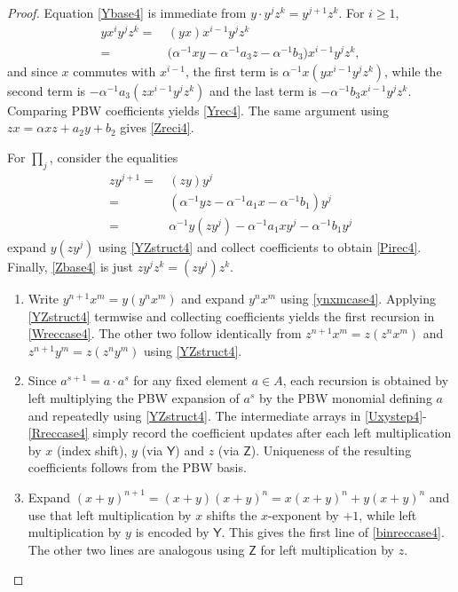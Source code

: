 \documentclass{amsart}
\theoremstyle{definition}
\theoremstyle{remark}
\numberwithin{equation}{section}
\begin{document}
\begin{proof}
Equation \eqref{Ybase4} is immediate from $y\cdot y^j z^k=y^{j+1}z^k$. For $i\ge 1$,
\begin{align*}
yx^i y^j z^k = &\, (yx)x^{i-1}y^j z^k \\
= &\, \big(\alpha^{-1}xy-\alpha^{-1}a_3z-\alpha^{-1}b_3\big)x^{i-1}y^j z^k,
\end{align*}
and since $x$ commutes with $x^{i-1}$, the first term is $\alpha^{-1}x(yx^{i-1}y^j z^k)$, while the second term is $-\alpha^{-1}a_3(zx^{i-1}y^j z^k)$ and the last term is $-\alpha^{-1}b_3 x^{i-1}y^j z^k$. Comparing PBW coefficients yields \eqref{Yrec4}. The same argument using $zx=\alpha xz+a_2y+b_2$ gives \eqref{Zreci4}.

For $\prod_j$, consider the equalities
\begin{align*}
z y^{j+1} = &\, (zy)y^j \\
=&\, (\alpha^{-1}yz-\alpha^{-1}a_1x-\alpha^{-1}b_1)y^j \\
= &\, \alpha^{-1}y(z y^j)-\alpha^{-1}a_1xy^j-\alpha^{-1}b_1y^j
\end{align*}
expand $y(z y^j)$ using \eqref{YZstruct4} and collect coefficients to obtain \eqref{Pirec4}. Finally, \eqref{Zbase4} is just $z y^j z^k=(z y^j)z^k$.
\begin{enumerate}
\item [\rm (1)] Write $y^{n+1}x^m=y(y^n x^m)$ and expand $y^n x^m$ using \eqref{ynxmcase4}. Applying \eqref{YZstruct4} termwise and collecting coefficients yields the first recursion in \eqref{Wreccase4}. The other two follow identically from $z^{n+1}x^m=z(z^n x^m)$ and $z^{n+1}y^m=z(z^n y^m)$ using \eqref{YZstruct4}.

\item [\rm (2) - (4)] Since $a^{s+1}=a\cdot a^s$ for any fixed element $a\in A$, each recursion is obtained by left multiplying the PBW expansion of $a^s$ by the PBW monomial defining $a$ and repeatedly using \eqref{YZstruct4}. The intermediate arrays in \eqref{Uxystep4}-\eqref{Rreccase4} simply record the coefficient updates after each left multiplication by $x$ (index shift), $y$ (via $\mathsf Y$) and $z$ (via $\mathsf Z$). Uniqueness of the resulting coefficients follows from the PBW basis.

\item [\rm (5)] Expand $(x+y)^{n+1}=(x+y)(x+y)^n=x(x+y)^n+y(x+y)^n$ and use that left multiplication by $x$ shifts the $x$-exponent by $+1$, while left multiplication by $y$ is encoded by $\mathsf Y$. This gives the first line of \eqref{binreccase4}. The other two lines are analogous using $\mathsf Z$ for left multiplication by $z$.
\end{enumerate} 
\end{proof}
\end{document}

